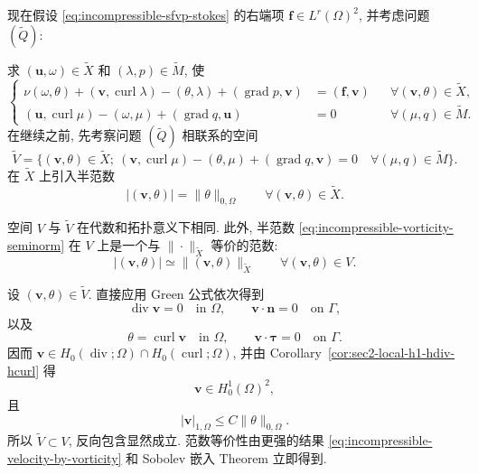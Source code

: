 {
现在假设
\eqref{eq:incompressible-sfvp-stokes} 的右端项
$\mathbf f\in L^r(\Omega)^2$, 并考虑问题 $(\widetilde Q)$:

求 $(\mathbf u,\omega)\in\widetilde X$ 和
$(\lambda,p)\in\widetilde M$, 使
\begin{equation}\label{eq:incompressible-weak-four-field}
\left\{
\begin{aligned}
\nu(\omega,\theta)
+(\mathbf v,\operatorname{curl}\lambda)
-(\theta,\lambda)+(\operatorname{grad}p,\mathbf v)
&=(\mathbf f,\mathbf v)
&&\forall(\mathbf v,\theta)\in\widetilde X,\\
(\mathbf u,\operatorname{curl}\mu)
-(\omega,\mu)+(\operatorname{grad}q,\mathbf u)
&=0
&&\forall(\mu,q)\in\widetilde M.
\end{aligned}
\right.
\end{equation}
在继续之前, 先考察问题 $(\widetilde Q)$ 相联系的空间
\begin{equation}\label{eq:incompressible-weak-four-field-kernel}
\widetilde V
=\{(\mathbf v,\theta)\in\widetilde X;\
(\mathbf v,\operatorname{curl}\mu)-(\theta,\mu)
+(\operatorname{grad}q,\mathbf v)=0
\quad\forall(\mu,q)\in\widetilde M\}.
\end{equation}
在 $\widetilde X$ 上引入半范数
\begin{equation}\label{eq:incompressible-vorticity-seminorm}
|(\mathbf v,\theta)|=\|\theta\|_{0,\Omega}
\qquad\forall(\mathbf v,\theta)\in\widetilde X.
\end{equation}

\begin{Lemma}\label{lem:incompressible-weak-kernel-coincidence}
空间 $V$ 与 $\widetilde V$ 在代数和拓扑意义下相同.
此外, 半范数
\eqref{eq:incompressible-vorticity-seminorm}
在 $V$ 上是一个与 $\|\cdot\|_{\widetilde X}$ 等价的范数:
\[
|(\mathbf v,\theta)|
\simeq\|(\mathbf v,\theta)\|_{\widetilde X}
\qquad\forall(\mathbf v,\theta)\in V.
\]
\end{Lemma}

\begin{Proof}
设 $(\mathbf v,\theta)\in\widetilde V$.
直接应用 Green 公式依次得到
\[
\operatorname{div}\mathbf v=0\quad\text{in }\Omega,
\qquad
\mathbf v\cdot\mathbf n=0\quad\text{on }\Gamma,
\]
以及
\[
\theta=\operatorname{curl}\mathbf v\quad\text{in }\Omega,
\qquad
\mathbf v\cdot\boldsymbol\tau=0\quad\text{on }\Gamma.
\]
因而
$\mathbf v\in H_0(\operatorname{div};\Omega)
\cap H_0(\operatorname{curl};\Omega)$,
并由 Corollary~\ref{cor:sec2-local-h1-hdiv-hcurl} 得
\[
\mathbf v\in H_0^1(\Omega)^2,
\]
且
\begin{equation}\label{eq:incompressible-velocity-by-vorticity}
|\mathbf v|_{1,\Omega}
\leq C\|\theta\|_{0,\Omega}.
\end{equation}
所以 $\widetilde V\subset V$, 反向包含显然成立.
范数等价性由更强的结果
\eqref{eq:incompressible-velocity-by-vorticity}
和 Sobolev 嵌入 Theorem 立即得到.
\end{Proof}

}
